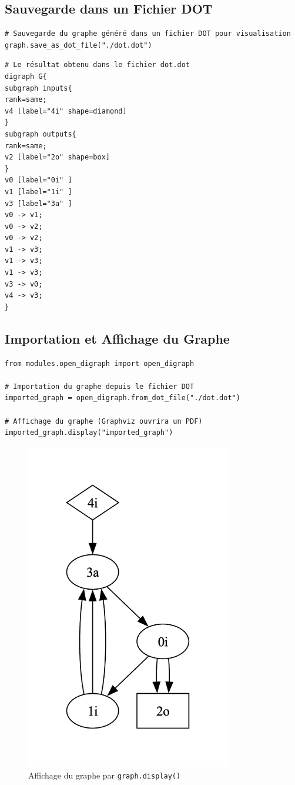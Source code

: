 \documentclass{article}
\begin{document}
\subsection*{Sauvegarde dans un Fichier DOT}
\begin{verbatim}
# Sauvegarde du graphe généré dans un fichier DOT pour visualisation
graph.save_as_dot_file("./dot.dot")
\end{verbatim}

\begin{verbatim}
# Le résultat obtenu dans le fichier dot.dot
digraph G{
subgraph inputs{
rank=same;
v4 [label="4i" shape=diamond]
}
subgraph outputs{
rank=same;
v2 [label="2o" shape=box]
}
v0 [label="0i" ]
v1 [label="1i" ]
v3 [label="3a" ]
v0 -> v1;
v0 -> v2;
v0 -> v2;
v1 -> v3;
v1 -> v3;
v1 -> v3;
v3 -> v0;
v4 -> v3;
} 
\end{verbatim}

\subsection*{Importation et Affichage du Graphe}
\begin{verbatim}
from modules.open_digraph import open_digraph

# Importation du graphe depuis le fichier DOT
imported_graph = open_digraph.from_dot_file("./dot.dot")

# Affichage du graphe (Graphviz ouvrira un PDF)
imported_graph.display("imported_graph")
\end{verbatim}

\begin{figure}[H]
    \centering
    \includegraphics[width=0.8\textwidth]{graph.png}
    \caption{Affichage du graphe par \texttt{graph.display()}}
    \label{fig:}
\end{figure}
\end{document}
